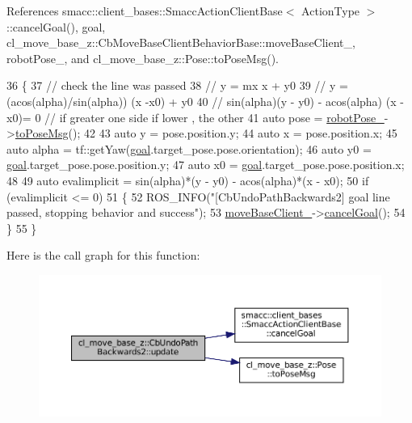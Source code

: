 References smacc\+::client\+\_\+bases\+::\+Smacc\+Action\+Client\+Base$<$ Action\+Type $>$\+::cancel\+Goal(), goal, cl\+\_\+move\+\_\+base\+\_\+z\+::\+Cb\+Move\+Base\+Client\+Behavior\+Base\+::move\+Base\+Client\+\_\+, robot\+Pose\+\_\+, and cl\+\_\+move\+\_\+base\+\_\+z\+::\+Pose\+::to\+Pose\+Msg().


\begin{DoxyCode}
36 \{
37   \textcolor{comment}{// check the line was passed}
38   \textcolor{comment}{// y = mx x + y0}
39   \textcolor{comment}{// y = (acos(alpha)/sin(alpha)) (x -x0) + y0}
40   \textcolor{comment}{// sin(alpha)(y - y0) - acos(alpha) (x -x0)= 0 // if greater one side if lower , the other}
41   \textcolor{keyword}{auto} pose = \hyperlink{classcl__move__base__z_1_1CbUndoPathBackwards2_a2d398dac07efaca840fbcea31957cf7a}{robotPose\_}->\hyperlink{classcl__move__base__z_1_1Pose_a9faf8c6b437ff6b19c8bddd692908dca}{toPoseMsg}();
42 
43   \textcolor{keyword}{auto} y = pose.position.y;
44   \textcolor{keyword}{auto} x = pose.position.x;
45   \textcolor{keyword}{auto} alpha = tf::getYaw(\hyperlink{classcl__move__base__z_1_1CbUndoPathBackwards2_a1b5d0fce772f7484b35abada92cf2b91}{goal}.target\_pose.pose.orientation);
46   \textcolor{keyword}{auto} y0 = \hyperlink{classcl__move__base__z_1_1CbUndoPathBackwards2_a1b5d0fce772f7484b35abada92cf2b91}{goal}.target\_pose.pose.position.y;
47   \textcolor{keyword}{auto} x0 = \hyperlink{classcl__move__base__z_1_1CbUndoPathBackwards2_a1b5d0fce772f7484b35abada92cf2b91}{goal}.target\_pose.pose.position.x;
48 
49   \textcolor{keyword}{auto} evalimplicit = sin(alpha)*(y - y0) - acos(alpha)*(x - x0);
50   \textcolor{keywordflow}{if} (evalimplicit <= 0)
51   \{
52     ROS\_INFO(\textcolor{stringliteral}{"[CbUndoPathBackwards2] goal line passed, stopping behavior and success"});
53     \hyperlink{classcl__move__base__z_1_1CbMoveBaseClientBehaviorBase_ab2ef219464cfac8659b4a87c8d0db6d5}{moveBaseClient\_}->\hyperlink{classsmacc_1_1client__bases_1_1SmaccActionClientBase_aedeaf9704b73bf05b5522f7250416c9a}{cancelGoal}();
54   \}
55 \}
\end{DoxyCode}
Here is the call graph for this function\+:
\nopagebreak
\begin{figure}[H]
\begin{center}
\leavevmode
\includegraphics[width=350pt]{classcl__move__base__z_1_1CbUndoPathBackwards2_a62f0d53fc341ca6d241637cc0e4b2e30_cgraph}
\end{center}
\end{figure}


